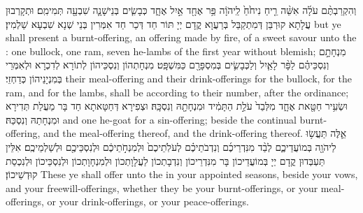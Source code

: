{וְהִקְרַבְתֶּ֨ם עֹלָ֜ה אִשֵּׁ֨ה רֵ֤יחַ נִיחֹ֙חַ֙ לַֽיהֹוָ֔ה פַּ֥ר אֶחָ֖ד אַ֣יִל אֶחָ֑ד כְּבָשִׂ֧ים בְּנֵי\maqqaf שָׁנָ֛ה שִׁבְעָ֖ה תְּמִימִֽם׃}
{וּתְקָרְבוּן עֲלָתָא קוּרְבַּן דְּמִתְקַבַּל בְּרַעֲוָא קֳדָם יְיָ תּוֹר חַד דְּכַר חַד אִמְּרִין בְּנֵי שְׁנָא שִׁבְעָא שַׁלְמִין׃}
{but ye shall present a burnt-offering, an offering made by fire, of a sweet savour unto the \lord: one bullock, one ram, seven he-lambs of the first year without blemish;}{}
{מִנְחָתָ֣ם וְנִסְכֵּיהֶ֗ם לַפָּ֨ר לָאַ֧יִל וְלַכְּבָשִׂ֛ים בְּמִסְפָּרָ֖ם כַּמִּשְׁפָּֽט׃}
{מִנְחָתְהוֹן וְנִסְכֵּיהוֹן לְתוֹרָא לְדִכְרָא וּלְאִמְּרֵי בְּמִנְיָנֵיהוֹן כְּדַחְזֵי׃}
{their meal-offering and their drink-offerings for the bullock, for the ram, and for the lambs, shall be according to their number, after the ordinance;}{}
{וּשְׂעִ֥יר חַטָּ֖את אֶחָ֑ד מִלְּבַד֙ עֹלַ֣ת הַתָּמִ֔יד וּמִנְחָתָ֖הּ וְנִסְכָּֽהּ׃}
{וּצְפִירָא דְּחַטָּאתָא חַד בָּר מֵעֲלַת תְּדִירָא וּמִנְחָתַהּ וְנִסְכַּהּ׃}
{and one he-goat for a sin-offering; beside the continual burnt-offering, and the meal-offering thereof, and the drink-offering thereof.}{}
{אֵ֛לֶּה תַּעֲשׂ֥וּ לַיהֹוָ֖ה בְּמוֹעֲדֵיכֶ֑ם לְבַ֨ד מִנִּדְרֵיכֶ֜ם וְנִדְבֹתֵיכֶ֗ם לְעֹלֹֽתֵיכֶם֙ וּלְמִנְחֹ֣תֵיכֶ֔ם וּלְנִסְכֵּיכֶ֖ם וּלְשַׁלְמֵיכֶֽם׃}
{אִלֵּין תַּעְבְּדוּן קֳדָם יְיָ בְּמוֹעֲדֵיכוֹן בָּר מִנִּדְרֵיכוֹן וְנִדְבָתְכוֹן לַעֲלָוָתְכוֹן וּלְמִנְחָוָתְכוֹן וּלְנִסְכֵּיכוֹן וּלְנִכְסַת קוּדְשֵׁיכוֹן׃}
{These ye shall offer unto the \lord\space in your appointed seasons, beside your vows, and your freewill-offerings, whether they be your burnt-offerings, or your meal-offerings, or your drink-offerings, or your peace-offerings.}{}
\newperek
{}%
